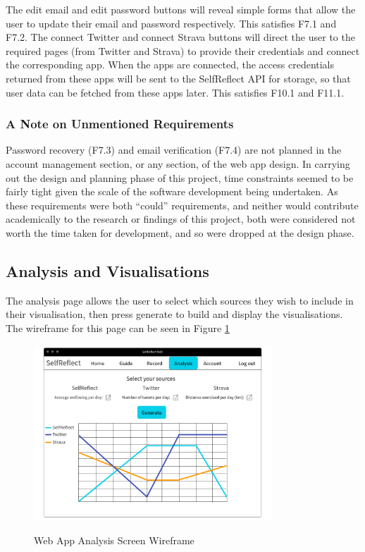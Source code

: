 \documentclass[11pt,openright,a4paper]{report}
\begin{document}
The edit email and edit password buttons will reveal simple forms that allow the user to update their email and password respectively. This satisfies F7.1 and F7.2. The connect Twitter and connect Strava buttons will direct the user to the required pages (from Twitter and Strava) to provide their credentials and connect the corresponding app. When the apps are connected, the access credentials returned from these apps will be sent to the SelfReflect API for storage, so that user data can be fetched from these apps later. This satisfies F10.1 and F11.1.

\newpage
\subsubsection{A Note on Unmentioned Requirements}
Password recovery (F7.3) and email verification (F7.4) are not planned in the account management section, or any section, of the web app design. In carrying out the design and planning phase of this project, time constraints seemed to be fairly tight given the scale of the software development being undertaken. As these requirements were both \enquote{could} requirements, and neither would contribute academically to the research or findings of this project, both were considered not worth the time taken for development, and so were dropped at the design phase.

\subsection{Analysis and Visualisations}
The analysis page allows the user to select which sources they wish to include in their visualisation, then press generate to build and display the visualisations. The wireframe for this page can be seen in Figure \ref{fig:webanalysis}

\begin{figure}[ht]
\centering
\caption{Web App Analysis Screen Wireframe}
\includegraphics[width=0.8\textwidth]{i/webanalysis.png}
\label{fig:webanalysis}
\end{figure}
\end{document}
